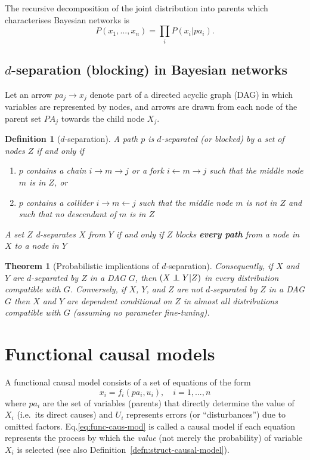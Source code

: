 \documentclass[11pt]{article}
\numberwithin{equation}{section}
\newcommand\indep{\protect\mathpalette{\protect\independenT}{\perp}}
\def\independenT#1#2{\mathrel{\rlap{$#1#2$}\mkern2mu{#1#2}}}
\newtheorem{thm}{Theorem}[section]
\newtheorem{defn}{Definition}[section]
\begin{document}
The recursive decomposition of the joint distribution into parents which characterises Bayesian networks is
\begin{equation}
P(x_1, ..., x_n) = \prod_i P(x_i|pa_i). \label{eq:bayes-net-char}
\end{equation}

\subsection{$d$-separation (blocking) in Bayesian networks} \label{sec:blocking}

Let an arrow $pa_j \rightarrow x_j$ denote part of a directed acyclic graph (DAG) in which variables are represented by nodes, and arrows are drawn from each node of the parent set $PA_j$ towards the child node $X_j$.

\begin{defn}[$d$-separation] \label{defn:d-sep}
A path $p$ is $d$-separated (or blocked) by a set of nodes $Z$ if and only if
\begin{enumerate}[noitemsep]
\item $p$ contains a chain $i \rightarrow m \rightarrow j$ or a fork $i \leftarrow m \rightarrow j$ such that the middle node $m$ is in $Z$, or
\item $p$ contains a collider $i \rightarrow m \leftarrow j$ such that the middle node $m$ is not in $Z$ and such that no descendant of $m$ is in $Z$
\end{enumerate}
A set $Z$ d-separates $X$ from $Y$ if and only if $Z$ blocks \textbf{every path} from a node in $X$ to a node in $Y$
\end{defn}

\begin{thm}[Probabilistic implications of $d$-separation] \label{thm:d-separation-indep}
Consequently, if $X$ and $Y$ are $d$-separated by $Z$ in a DAG $G$, then $(X \indep Y | Z)$ in every distribution compatible with $G$. Conversely, if $X$, $Y$, and $Z$ are \textit{not} $d$-separated by $Z$ in a DAG $G$ then $X$ and $Y$ are dependent conditional on $Z$ in almost all distributions compatible with $G$ (assuming no parameter fine-tuning).
\end{thm}

\section{Functional causal models}
A functional causal model consists of a set of equations of the form
\begin{equation}
x_i = f_i(pa_i, u_i), \quad i=1,...,n \label{eq:func-caus-mod}
\end{equation}
where $pa_i$ are the set of variables (parents) that directly determine the value of $X_i$ (i.e.\ its direct causes) and $U_i$ represents errors (or ``disturbances'') due to omitted factors. Eq.\eqref{eq:func-caus-mod} is called a causal model if each equation represents the process by which the \textit{value} (not merely the probability) of variable $X_i$ is selected (see also Definition~\ref{defn:struct-causal-model}).
\end{document}
